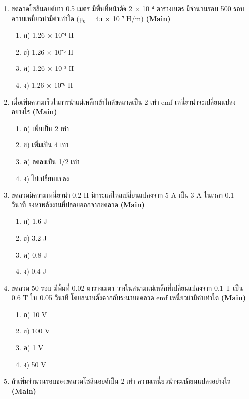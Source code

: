 \documentclass[12pt]{article}
\begin{document}
\begin{enumerate}[label=\arabic*.]
\begin{enumerate}[label=)]
\item ก) 0.005 Wb
\item ข) 0.05 Wb
\item ค) 0.5 Wb
\item ง) 5 × 10⁻⁴ Wb
\end{enumerate}
\item ขดลวดโซลินอยด์ยาว 0.5 เมตร มีพื้นที่หน้าตัด 2 × 10⁻⁴ ตารางเมตร มีจำนวนรอบ 500 รอบ ความเหนี่ยวนำมีค่าเท่าใด (μ₀ = 4π × 10⁻⁷ H/m) \hfill \textbf{\small (Main)}
\begin{enumerate}[label=)]
\item ก) 1.26 × 10⁻⁴ H
\item ข) 1.26 × 10⁻⁵ H
\item ค) 1.26 × 10⁻³ H
\item ง) 1.26 × 10⁻⁶ H
\end{enumerate}
\item เมื่อเพิ่มความเร็วในการนำแม่เหล็กเข้าใกล้ขดลวดเป็น 2 เท่า emf เหนี่ยวนำจะเปลี่ยนแปลงอย่างไร \hfill \textbf{\small (Main)}
\begin{enumerate}[label=)]
\item ก) เพิ่มเป็น 2 เท่า
\item ข) เพิ่มเป็น 4 เท่า
\item ค) ลดลงเป็น 1/2 เท่า
\item ง) ไม่เปลี่ยนแปลง
\end{enumerate}
\item ขดลวดมีความเหนี่ยวนำ 0.2 H มีกระแสไหลเปลี่ยนแปลงจาก 5 A เป็น 3 A ในเวลา 0.1 วินาที จงหาพลังงานที่ปล่อยออกจากขดลวด \hfill \textbf{\small (Main)}
\begin{enumerate}[label=)]
\item ก) 1.6 J
\item ข) 3.2 J
\item ค) 0.8 J
\item ง) 0.4 J
\end{enumerate}
\item ขดลวด 50 รอบ มีพื้นที่ 0.02 ตารางเมตร วางในสนามแม่เหล็กที่เปลี่ยนแปลงจาก 0.1 T เป็น 0.6 T ใน 0.05 วินาที โดยสนามตั้งฉากกับระนาบขดลวด emf เหนี่ยวนำมีค่าเท่าใด \hfill \textbf{\small (Main)}
\begin{enumerate}[label=)]
\item ก) 10 V
\item ข) 100 V
\item ค) 1 V
\item ง) 50 V
\end{enumerate}
\item ถ้าเพิ่มจำนวนรอบของขดลวดโซลินอยด์เป็น 2 เท่า ความเหนี่ยวนำจะเปลี่ยนแปลงอย่างไร \hfill \textbf{\small (Main)}

\end{enumerate}
\end{document}
